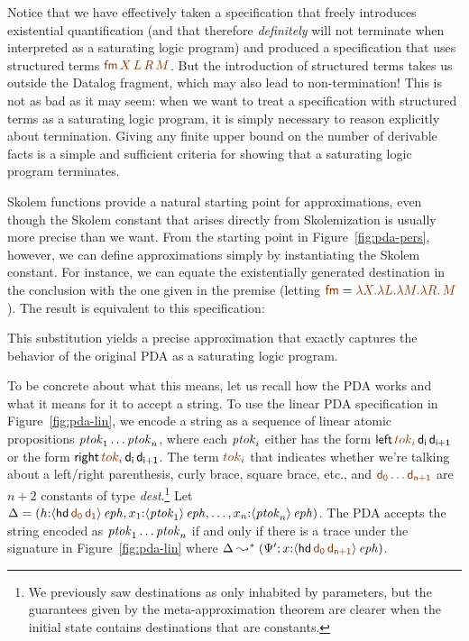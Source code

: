 Notice that we have effectively taken a specification that freely
introduces existential quantification (and that therefore {\it
  definitely} will not terminate when interpreted as a saturating
logic program) and produced a specification that uses structured terms
$\lf{{\sf fm}\,X\,L\,R\,M}$. But the
introduction of structured terms takes us outside the Datalog fragment,
which may also lead to non-termination! This is not as bad as it may
seem: when we want to treat a specification with structured terms as a
saturating logic program, it is simply necessary to reason explicitly
about termination. Giving any finite upper bound on the number of
derivable facts is a simple and sufficient criteria for showing that a
saturating logic program terminates.

Skolem functions provide a natural starting point for approximations,
even though the Skolem constant that arises directly from
Skolemization is usually more precise than we want. From the starting
point in Figure~\ref{fig:pda-pers}, however, we can define
approximations simply by instantiating the Skolem constant.  For
instance, we can equate the existentially generated destination in the
conclusion with the one given in the premise (letting $\lf{\sf fm} =
\lf{\lambda X. \lambda L. \lambda M. \lambda R.\, M}$). The result is
equivalent to this specification:

\smallskip
{}
\smallskip

\noindent This substitution yields a precise approximation that
exactly captures the behavior of the original PDA as a saturating
logic program. 

To be concrete about what this means, let us recall how the PDA works
and what it means for it to accept a string.  To use the linear PDA
specification in Figure~\ref{fig:pda-lin}, we encode a string as a
sequence of linear atomic propositions ${\it ptok}_1\ldots {\it
  ptok}_n$, where each ${\it ptok}_i$ either has the form ${\sf
  left}\,\lf{tok_i}\,{\sf d_i}\,{\sf d_{i+1}}$ or the form ${\sf
  right}\,\lf{tok_i}\,{\sf d_i}\,{\sf d_{i+1}}$. The term $\lf{tok_i}$
that indicates whether we're talking about a left/right parenthesis,
curly brace, square brace, etc., and $\lf{{\sf d_0}\ldots{\sf
    d_{n+1}}}$ are $n+2$ constants of type {\it dest}.\footnote{We
  previously saw destinations as only inhabited by parameters, but the
  guarantees given by the meta-approximation theorem are clearer when
  the initial state contains destinations that are constants.}  Let
$\Delta = (h{:}\iseph{\susp{{\sf hd}\,\lf{\sf d_0}\,\lf{\sf d_1}}},
x_1{:}{\iseph{\susp{{\it ptok}_1}}}, \ldots,
x_n{:}{\iseph{\susp{{\it ptok}_n}}})$. The PDA
accepts the string encoded as ${\it ptok}_1\ldots {\it ptok}_n$ if and
only if there is a trace under the signature in
Figure~\ref{fig:pda-lin} where $\Delta \leadsto^* (\Psi';
x{:}\iseph{\susp{{{\sf hd}\,\lf{\sf d_0}\,\lf{\sf d_{n+1}}}}})$.

